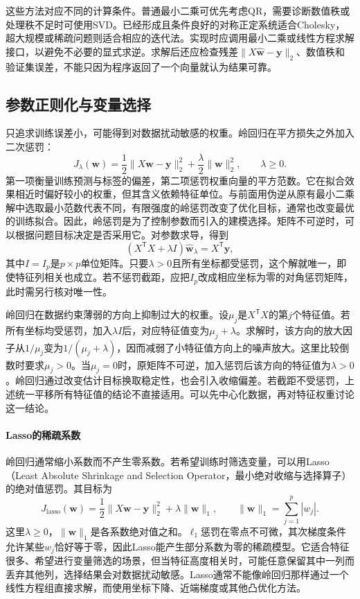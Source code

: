 这些方法对应不同的计算条件。普通最小二乘可优先考虑QR，需要诊断数值秩或处理秩不足时可使用SVD。已经形成且条件良好的对称正定系统适合Cholesky，超大规模或稀疏问题则适合相应的迭代法。实现时应调用最小二乘或线性方程求解接口，以避免不必要的显式求逆。求解后还应检查残差$\|X\hat{\bm w}-\bm y\|_2$、数值秩和验证集误差，不能只因为程序返回了一个向量就认为结果可靠。

\subsection{参数正则化与变量选择}
只追求训练误差小，可能得到对数据扰动敏感的权重。岭回归在平方损失之外加入二次惩罚\cite{hoerl1970ridge}：
\begin{equation}
 J_\lambda(\bm w)=\frac12\|X\bm w-\bm y\|_2^2
 +\frac\lambda2\|\bm w\|_2^2,\qquad\lambda\geq0.\label{eq:linear-ridge-objective}
\end{equation}
第一项衡量训练预测与标签的偏差，第二项惩罚权重向量的平方范数。它在拟合效果相近时偏好较小的权重，但其含义依赖特征单位。与前面用伪逆从原有最小二乘解中选取最小范数代表不同，有限强度的岭惩罚改变了优化目标，通常也改变最优的训练拟合。因此，岭惩罚是为了控制参数而引入的建模选择。矩阵不可逆时，可以根据问题目标决定是否采用它。对参数求导，得到
\begin{equation}
 (X^{\mathsf T}X+\lambda I)\hat{\bm w}_\lambda=X^{\mathsf T}\bm y,
\end{equation}
其中$I=I_p$是$p\times p$单位矩阵。只要$\lambda>0$且所有坐标都受惩罚，这个解就唯一，即使特征列相关也成立。若不惩罚截距，应把$I_p$改成相应坐标为零的对角惩罚矩阵，此时需另行核对唯一性。

岭回归在数据约束薄弱的方向上抑制过大的权重。设$\mu_j$是$X^{\mathsf T}X$的第$j$个特征值。若所有坐标均受惩罚，加入$\lambda I$后，对应特征值变为$\mu_j+\lambda$。求解时，该方向的放大因子从$1/\mu_j$变为$1/(\mu_j+\lambda)$，因而减弱了小特征值方向上的噪声放大。这里比较倒数时要求$\mu_j>0$。当$\mu_j=0$时，原矩阵不可逆，加入惩罚后该方向的特征值为$\lambda>0$。岭回归通过改变估计目标换取稳定性，也会引入收缩偏差。若截距不受惩罚，上述统一平移所有特征值的结论不直接适用。可以先中心化数据，再对特征权重讨论这一结论。

\paragraph{Lasso的稀疏系数}
岭回归通常缩小系数而不产生零系数。若希望训练时筛选变量，可以用Lasso（Least Absolute Shrinkage and Selection Operator，最小绝对收缩与选择算子）的绝对值惩罚。其目标为
\begin{equation}
 J_{\mathrm{lasso}}(\bm w)=\frac12\|X\bm w-\bm y\|_2^2+\lambda\|\bm w\|_1,
 \qquad \|\bm w\|_1=\sum_{j=1}^p|w_j|.
 \label{eq:linear-lasso-objective}
\end{equation}
这里$\lambda\geq0$，$\|\bm w\|_1$是各系数绝对值之和。$\ell_1$惩罚在零点不可微，其次梯度条件允许某些$w_j$恰好等于零，因此Lasso能产生部分系数为零的稀疏模型。它适合特征很多、希望进行变量筛选的场景，但当特征高度相关时，可能任意保留其中一列而丢弃其他列，选择结果会对数据扰动敏感。Lasso通常不能像岭回归那样通过一个线性方程组直接求解，而使用坐标下降、近端梯度或其他凸优化方法。

